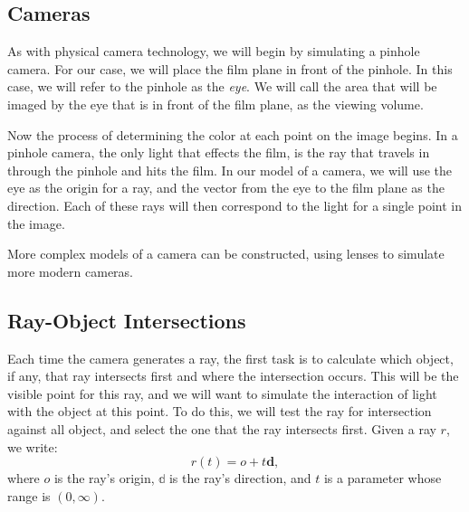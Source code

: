 \documentclass[
]{book}
\begin{document}
\hypertarget{cameras}{%
\subsection{Cameras}\label{cameras}}

As with physical camera technology, we will begin by simulating a pinhole
camera. For our case, we will place the film plane in front of the pinhole. In
this case, we will refer to the pinhole as the \emph{eye}. We will call the area
that will be imaged by the eye that is in front of the film plane, as the
viewing volume.

Now the process of determining the color at each point on the image begins. In
a pinhole camera, the only light that effects the film, is the ray that travels
in through the pinhole and hits the film. In our model of a camera, we will use
the eye as the origin for a ray, and the vector from the eye to the film plane
as the direction. Each of these rays will then correspond to the light for a
single point in the image.

More complex models of a camera can be constructed, using lenses to simulate
more modern cameras.

\hypertarget{ray-object-intersections}{%
\subsection{Ray-Object Intersections}\label{ray-object-intersections}}

Each time the camera generates a ray, the first task is to calculate which
object, if any, that ray intersects first and where the intersection occurs.
This will be the visible point for this ray, and we will want to simulate the
interaction of light with the object at this point. To do this, we will test
the ray for intersection against all object, and select the one that the ray
intersects first. Given a ray \(r\), we write:
\[
r(t)=o+t\mathbf{d},
\]
where \(o\) is the ray's origin, \(\mathbb{d}\) is the ray's direction, and
\(t\) is a parameter whose range is \((0,\infty)\).

\backmatter
\end{document}
